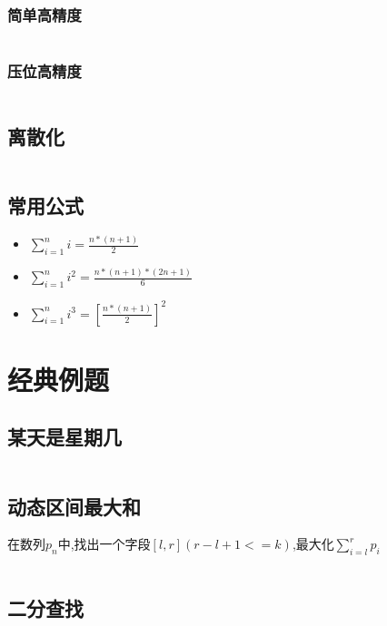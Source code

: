\documentclass[a4paper,11pt]{article}
\begin{document}
\subsubsection{简单高精度}
\inputminted[breaklines,linenos,frame=leftline]{c++}{others/bignum2.cpp}
\subsubsection{压位高精度}
\inputminted[breaklines,linenos,frame=leftline]{c++}{others/bignum1.cpp}

\subsection{离散化}
\inputminted[breaklines,linenos,frame=leftline]{c++}{others/discretize.cpp}

\subsection{常用公式}
\begin{itemize}
    \item $\sum_{i=1}^{n} i = \frac{n*(n+1)}{2} $
    \item $\sum_{i=1}^{n} i^2 = \frac{n*(n+1)*(2n+1)}{6} $
    \item $\sum_{i=1}^{n} i^3 = \left[\frac{n*(n+1)}{2}\right]^2 $
\end{itemize}

\newpage
\section{经典例题}
\subsection{某天是星期几}
\inputminted[breaklines]{c++}{question/1.cpp}

\subsection{动态区间最大和}
在数列${p_n}$中,找出一个字段$[l,r](r-l+1<=k)$,最大化$\sum^r_{i=l}p_i$
\inputminted[breaklines]{c++}{question/2.cpp}

\subsection{二分查找}
\inputminted[breaklines]{c++}{question/3.cpp}
\end{document}
